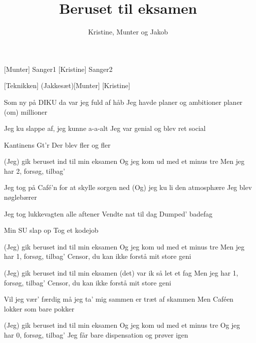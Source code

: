 \documentclass[a4paper,11pt]{article}
\title{Beruset til eksamen}
\author{Kristine, Munter og Jakob}
\begin{document}
\maketitle

\begin{roles}  
[Munter] Sanger1
[Kristine] Sanger2
\end{roles}

\begin{props}
[Teknikken] 
\prop(Jakkesæt)[Munter]
[Kristine]
\end{props}

\begin{song}

 Som ny på DIKU da var jeg fuld af håb
Jeg havde planer og ambitioner
planer (om) millioner

 Jeg ku slappe af, jeg kunne a-a-alt
Jeg var genial
og blev ret social

 Kantinens Gt'r
Der blev fler og fler

 (Jeg) gik beruset ind til min eksamen
Og jeg kom ud med et minus tre
 Men jeg har 2, forsøg, tilbag'

 Jeg tog på Café'n for at skylle sorgen ned
 (Og) jeg ku li den atmosphære
Jeg blev nøglebærer

 Jeg tog lukkevagten alle aftener
Vendte nat til dag
Dumped' badefag

 Min SU slap op
Tog et kodejob

 (Jeg) gik beruset ind til min eksamen
Og jeg kom ud med et minus tre
 Men jeg har 1, forsøg, tilbag'
 Censor, du kan ikke forstå mit store geni

 (Jeg) gik beruset ind til min eksamen
(det) var ik så let et fag
 Men jeg har 1, forsøg, tilbag'
 Censor, du kan ikke forstå mit store geni


 Vil jeg vær' færdig må jeg ta' mig sammen
er træt af skammen
Men Caféen lokker
som bare pokker


 (Jeg) gik beruset ind til min eksamen
Og jeg kom ud med et minus tre
Og jeg har 0, forsøg, tilbag'
 Jeg får bare dispensation og prøver igen 


\end{song}
\end{document}
